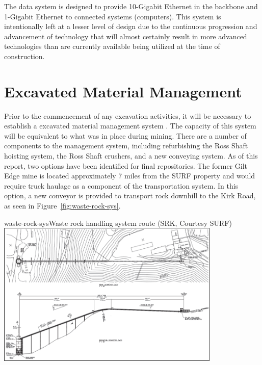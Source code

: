 The data system is designed to provide 10-Gigabit Ethernet in the backbone and 1-Gigabit Ethernet to connected systems (computers). This system is intentionally left at a lesser level of design due to the continuous progression and advancement of technology that will almost certainly result in more advanced technologies than are currently available being utilized at the time of construction.

\section{Excavated Material Management}
\label{sec:fscf-und-waste-rock}

Prior to the commencement of any excavation activities, it will be necessary to establish a excavated material management system . The capacity of this system will be equivalent to what was in place during mining. 
There are a number of components to the management system, including refurbishing the Ross Shaft hoisting system, the Ross Shaft crushers, and a new conveying system.  As of this report, two options have been identified for final repositories.  The former Gilt Edge mine is located approximately 7 miles from the SURF property and would require truck haulage as a component of the transportation system.  In this option, a new conveyor is provided to transport rock downhill to the Kirk Road, as seen in Figure~\ref{fig:waste-rock-sys}. 

\begin{cdrfigure}{waste-rock-sys}{Waste rock handling system route (SRK, Courtesy SURF)}
\includegraphics[width=0.8\textwidth]{waste-rock-sys}
\end{cdrfigure}

